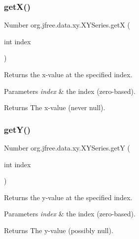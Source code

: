 \subsubsection{\texorpdfstring{get\+X()}{getX()}}
{\footnotesize\ttfamily Number org.\+jfree.\+data.\+xy.\+X\+Y\+Series.\+getX (\begin{DoxyParamCaption}\item[{int}]{index }\end{DoxyParamCaption})}

Returns the x-\/value at the specified index.


\begin{DoxyParams}{Parameters}
{\em index} & the index (zero-\/based).\\
\hline
\end{DoxyParams}
\begin{DoxyReturn}{Returns}
The x-\/value (never {\ttfamily null}). 
\end{DoxyReturn}
\mbox{\label{classorg_1_1jfree_1_1data_1_1xy_1_1_x_y_series_a60fbd356263fa7cae94de0ec868dc34d}} 
\subsubsection{\texorpdfstring{get\+Y()}{getY()}}
{\footnotesize\ttfamily Number org.\+jfree.\+data.\+xy.\+X\+Y\+Series.\+getY (\begin{DoxyParamCaption}\item[{int}]{index }\end{DoxyParamCaption})}

Returns the y-\/value at the specified index.


\begin{DoxyParams}{Parameters}
{\em index} & the index (zero-\/based).\\
\hline
\end{DoxyParams}
\begin{DoxyReturn}{Returns}
The y-\/value (possibly {\ttfamily null}). 
\end{DoxyReturn}
\mbox{\label{classorg_1_1jfree_1_1data_1_1xy_1_1_x_y_series_aaf54ed4875262167d9e87e8b6123f552}} 
